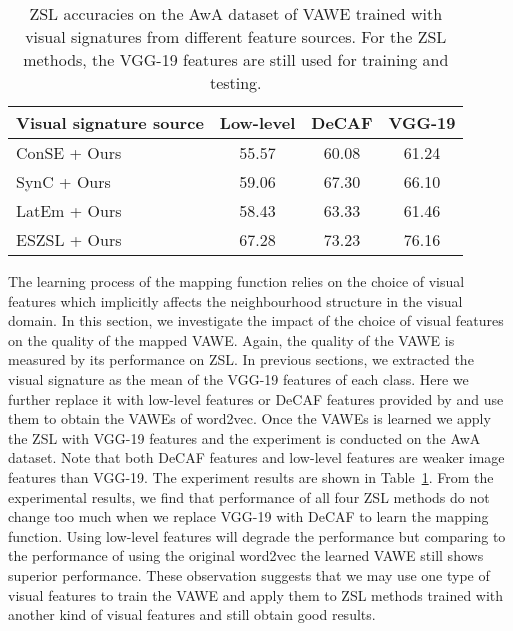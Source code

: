 \documentclass{bmvc2k}
\begin{document}
\begin{table}[h]
\begin{center}
\begin{tabular}{|l|c|c|c|}
\hline
Visual signature source &Low-level &DeCAF &VGG-19  \\
\hline
\hline
ConSE + Ours &55.57   &60.08 &61.24 \\
SynC + Ours &59.06 &67.30  &66.10  \\
LatEm + Ours &58.43 &63.33 &61.46   \\
ESZSL + Ours &67.28 &73.23 &76.16   \\


\hline
\end{tabular}
\end{center}
\caption{ZSL accuracies on the AwA dataset of VAWE trained with visual signatures from different feature sources. For the ZSL methods, the VGG-19 features are still used for training and testing.}
\label{tab: zsl-sig}
\end{table}

The learning process of the mapping function relies on the choice of visual features which implicitly affects the neighbourhood structure in the visual domain. In this section, we investigate the impact of the choice of visual features on the quality of the mapped VAWE. Again, the quality of the VAWE is measured by its performance on ZSL. In previous sections, we extracted the visual signature as the mean of the VGG-19 features of each class. Here we further replace it with low-level features or DeCAF features provided by \cite{Lampert09unseen} and use them to obtain the VAWEs of word2vec. Once the VAWEs is learned we apply the ZSL with VGG-19 features and the experiment is conducted on the AwA dataset. Note that both DeCAF features and low-level features are weaker image features than VGG-19. The experiment results are shown in Table~\ref{tab: zsl-sig}. From the experimental results, we find that performance of all four ZSL methods do not change too much when we replace VGG-19 with DeCAF to learn the mapping function. Using low-level features will degrade the performance but comparing to the performance of using the original word2vec the learned VAWE still shows superior performance. These observation suggests that we may use one type of visual features to train the VAWE and apply them to ZSL methods trained with another kind of visual features and still obtain good results.
\end{document}
